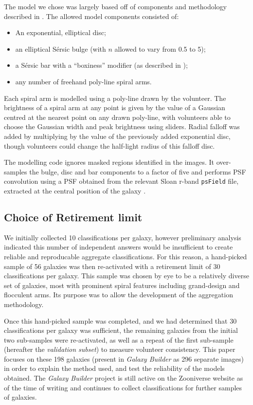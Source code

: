 \documentclass[../main.tex]{subfiles}
\begin{document}
The model we chose was largely based off of components and methodology described in \citet{galfit-paper}. The allowed model components consisted of: 
\begin{itemize}
\item An exponential, elliptical disc; 
\item an elliptical S\'ersic bulge (with $n$ allowed to vary from 0.5 to 5); 
\item a S\'ersic bar with a ``boxiness'' modifier (as described in \citealt{galfit-paper}); 
\item any number of freehand poly-line spiral arms.
\end{itemize}

Each spiral arm is modelled using a poly-line drawn by the volunteer. The brightness of a spiral arm at any point is given by the value of a Gaussian centred at the nearest point on any drawn poly-line, with volunteers able to choose the Gaussian width and peak brightness using sliders. Radial falloff was added by multiplying by the value of the previously added exponential disc, though volunteers could change the half-light radius of this falloff disc.

The modelling code ignores masked regions identified in the images. %
It over-samples the bulge, disc and bar components to a factor of five and performs PSF convolution using a PSF obtained from the relevant Sloan r-band \texttt{psField} file, extracted at the central position of the galaxy \citep{2002AJ....123..485S}.

\subsection{Choice of Retirement limit}
\label{sec:retirement-limit}

We initially collected 10 classifications per galaxy, however preliminary analysis indicated this number of independent answers would be insufficient to create reliable and reproducable aggregate classifications. For this reason, a hand-picked sample of 56 galaxies was then re-activated with a retirement limit of 30 classifications per galaxy. This sample was chosen by eye to be a relatively diverse set of galaxies, most with prominent spiral features including grand-design and flocculent arms. Its purpose was to allow the development of the aggregation methodology.

Once this hand-picked sample was completed, and we had determined that 30 classifications per galaxy was sufficient, the remaining galaxies from the initial two sub-samples were re-activated, as well as a repeat of the first sub-sample (hereafter the \textit{validation subset}) to measure volunteer consistency. This paper focuses on these 198 galaxies (present in \textit{Galaxy Builder} as 296 separate images) in order to explain the method used, and test the reliability of the models obtained. The \textit{Galaxy Builder} project is still active on the Zooniverse website as of the time of writing and continues to collect classifications for further samples of galaxies. 
\end{document}
